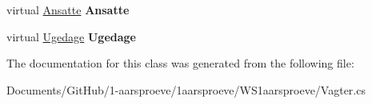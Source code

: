 \begin{DoxyCompactItemize}
\item 
\hypertarget{class_w_s1aarsproeve_1_1_vagter_a2793f3c463e74e54f5c8603a43975801}{}virtual \hyperlink{class_w_s1aarsproeve_1_1_ansatte}{Ansatte} {\bfseries Ansatte}\label{class_w_s1aarsproeve_1_1_vagter_a2793f3c463e74e54f5c8603a43975801}

\item 
\hypertarget{class_w_s1aarsproeve_1_1_vagter_a42b24975fdaae325592096c66731bc36}{}virtual \hyperlink{class_w_s1aarsproeve_1_1_ugedage}{Ugedage} {\bfseries Ugedage}\label{class_w_s1aarsproeve_1_1_vagter_a42b24975fdaae325592096c66731bc36}

\end{DoxyCompactItemize}


The documentation for this class was generated from the following file\+:\begin{DoxyCompactItemize}
\item 
Documents/\+Git\+Hub/1-\/aarsproeve/1aarsproeve/\+W\+S1aarsproeve/Vagter.\+cs\end{DoxyCompactItemize}

